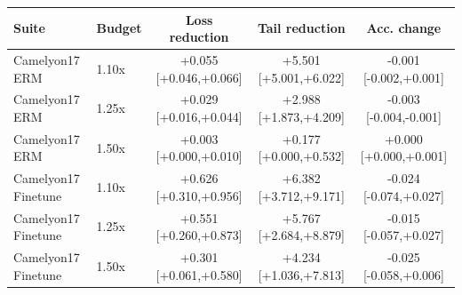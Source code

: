 \begin{tabular}{llccc}
  \toprule
  Suite & Budget & Loss reduction & Tail reduction & Acc. change \\
  \midrule
  Camelyon17 ERM & 1.10x & +0.055 [+0.046,+0.066] & +5.501 [+5.001,+6.022] & -0.001 [-0.002,+0.001] \\
  Camelyon17 ERM & 1.25x & +0.029 [+0.016,+0.044] & +2.988 [+1.873,+4.209] & -0.003 [-0.004,-0.001] \\
  Camelyon17 ERM & 1.50x & +0.003 [+0.000,+0.010] & +0.177 [+0.000,+0.532] & +0.000 [+0.000,+0.001] \\
  Camelyon17 Finetune & 1.10x & +0.626 [+0.310,+0.956] & +6.382 [+3.712,+9.171] & -0.024 [-0.074,+0.027] \\
  Camelyon17 Finetune & 1.25x & +0.551 [+0.260,+0.873] & +5.767 [+2.684,+8.879] & -0.015 [-0.057,+0.027] \\
  Camelyon17 Finetune & 1.50x & +0.301 [+0.061,+0.580] & +4.234 [+1.036,+7.813] & -0.025 [-0.058,+0.006] \\
  \bottomrule
\end{tabular}
